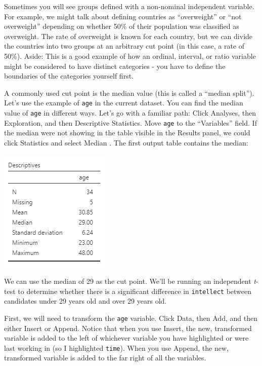 \documentclass[
]{book}
\begin{document}
Sometimes you will see groups defined with a non-nominal independent variable. For example, we might talk about defining countries as ``overweight'' or ``not overweight'' depending on whether 50\% of their population was classified as overweight. The rate of overweight is known for each country, but we can divide the countries into two groups at an arbitrary cut point (in this case, a rate of 50\%). Aside: This is a good example of how an ordinal, interval, or ratio variable might be considered to have distinct categories - you have to define the boundaries of the categories yourself first.

A commonly used cut point is the median value (this is called a ``median split''). Let's use the example of \texttt{age} in the current dataset. You can find the median value of \texttt{age} in different ways. Let's go with a familiar path: Click {Analyses}, then {Exploration}, and then { Descriptive Statistics}. Move \texttt{age} to the ``Variables'' field. If the median were not showing in the table visible in the Results panel, we could click {Statistics} and select {Median} . The first output table contains the median:

\includegraphics{img/DescriptivesTableForAgeVariable.png}

We can use the median of 29 as the cut point. We'll be running an independent \emph{t}-test to determine whether there is a significant difference in \texttt{intellect} between candidates under 29 years old and over 29 years old.

First, we will need to transform the \texttt{age} variable. Click {Data}, then {Add}, and then either {Insert} or {Append}. Notice that when you use {Insert}, the new, transformed variable is added to the left of whichever variable you have highlighted or were last working in (so I highlighted \texttt{time}). When you use {Append}, the new, transformed variable is added to the far right of all the variables.
\end{document}

